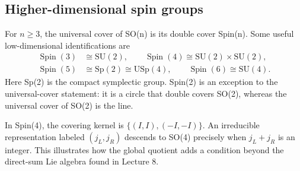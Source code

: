 \documentclass[11pt]{article}
\newcommand{\SU}{\mathrm{SU}}
\newcommand{\Sp}{\mathrm{Sp}}
\newcommand{\Spin}{\operatorname{Spin}}
\begin{document}
\subsection{Higher-dimensional spin groups}
For \(n\geq3\), the universal cover of SO(n) is its double cover Spin(n).
Some useful low-dimensional identifications are
\begin{equation}
 \begin{split}
 \Spin(3)&\cong\SU(2),\qquad
 \Spin(4)\cong\SU(2)\times\SU(2),\\
 \Spin(5)&\cong\Sp(2)\cong\mathrm{USp}(4),\qquad
 \Spin(6)\cong\SU(4).
 \end{split}
 \label{eq:spin-isomorphisms}
\end{equation}
Here Sp(2) is the compact symplectic group. Spin(2) is an exception to the
universal-cover statement: it is a circle that double covers SO(2),
whereas the universal cover of SO(2) is the line.

In Spin(4), the covering kernel is \(\{(I,I),(-I,-I)\}\). An irreducible
representation labeled \((j_L,j_R)\) descends to SO(4) precisely when
\(j_L+j_R\) is an integer. This illustrates how the global quotient adds
a condition beyond the direct-sum Lie algebra found in Lecture 8.

\clearpage
\end{document}
